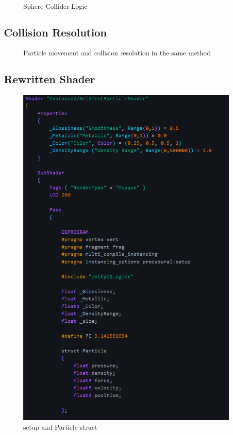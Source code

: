 \documentclass[a4paper, 12pt]{article}
\newcommand{\wideimage}[2][]{%
  \makebox[\textwidth][c]{\texttt{[image: \#2]}}%
}
\begin{document}
    \begin{figure}[H]
        \wideimage[]{sphereLogicGPU.png}
        \caption{Sphere Collider Logic}
    \end{figure}

    \subsection{Collision Resolution}

    \begin{figure}[H]
        \wideimage[]{moveParticlesGPU.png}
        \caption{Particle movement and collision resolution in the same method}
    \end{figure}

    \subsection{Rewritten Shader}

    \begin{figure}[H]
        \centering
        \includegraphics[height=0.8\textheight]{newShader1.png}
        \caption{setup and Particle struct}
    \end{figure}
\end{document}

